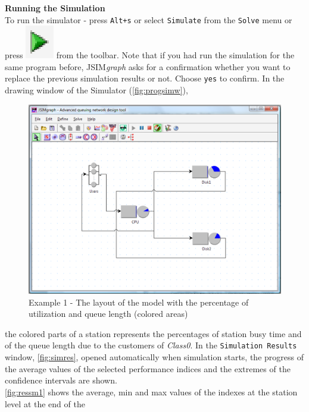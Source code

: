 \noindent \textbf{Running the Simulation}\\
To run the simulator - press \texttt{Alt+s} or select
\texttt{Simulate} from the \texttt{Solve} menu or press
\includegraphics[scale=.5]{img/jsimg/play} from the toolbar.
Note that if you had run the simulation for the same program
before, JSIM\emph{graph} asks for a confirmation whether you want
to replace the previous simulation results or not. Choose
\texttt{yes} to confirm. In the drawing window of the Simulator
(\autoref{fig:progsimw}),
\begin{figure}[htb]
    \begin{center}
        \includegraphics[scale=.5]{img/jsimg/12.14.eps}
    \end{center}
    \caption{Example 1 - The layout of the model with the percentage of
    utilization and queue length (colored areas)}
    \label{fig:progsimw}
\end{figure}
the colored parts of a station represents the percentages of
station busy time and of the queue length due to the customers of
\emph{Class0}. In the \texttt{Simulation Results} window,
\autoref{fig:simres},  opened automatically when simulation
starts, the progress of the average values of the selected
performance indices and the extremes of the confidence intervals
are shown.\\ \autoref{fig:ressm1} shows the average, min and max
values of the indexes at the station level at the end of the
